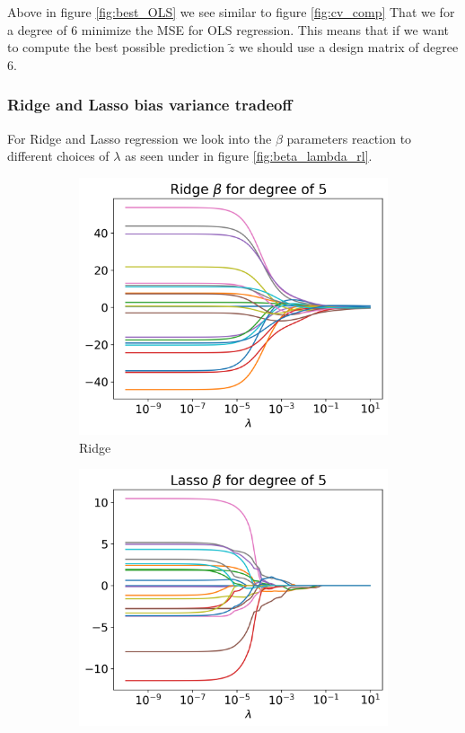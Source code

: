 \documentclass[12pt]{article}
\begin{document}
Above in figure \ref{fig:best_OLS} we see similar to figure \ref{fig:cv_comp} That we for a degree of 6 minimize the MSE for OLS regression. This means that if we want to compute the best possible prediction $\tilde{z}$ we should use a design matrix of degree 6.

\subsubsection{Ridge and Lasso bias variance tradeoff}
For Ridge and Lasso regression we look into the $\beta$ parameters reaction to different choices of $\lambda$ as seen under in figure \ref{fig:beta_lambda_rl}.
\begin{figure}[H]
  \begin{subfigure}{.5\textwidth}
    \centering
    \includegraphics[width=\textwidth]{../figures/ridge_beta.png}
    \caption{Ridge}
    \label{fig:}
  \end{subfigure}
  \begin{subfigure}{.5\textwidth}
    \centering
    \includegraphics[width=\textwidth]{../figures/lasso_beta.png}

\end{subfigure}
\end{figure}
\end{document}

